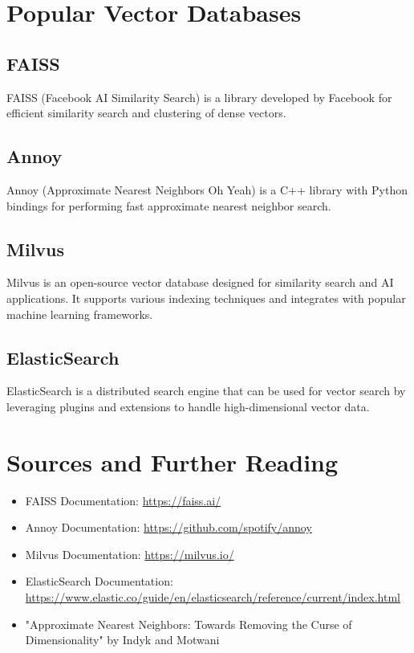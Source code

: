 \section{Popular Vector Databases}

\subsection{FAISS}
FAISS (Facebook AI Similarity Search) is a library developed by Facebook for efficient similarity search and clustering of dense vectors.

\subsection{Annoy}
Annoy (Approximate Nearest Neighbors Oh Yeah) is a C++ library with Python bindings for performing fast approximate nearest neighbor search.

\subsection{Milvus}
Milvus is an open-source vector database designed for similarity search and AI applications. It supports various indexing techniques and integrates with popular machine learning frameworks.

\subsection{ElasticSearch}
ElasticSearch is a distributed search engine that can be used for vector search by leveraging plugins and extensions to handle high-dimensional vector data.

\section{Sources and Further Reading}
\begin{itemize}
    \item FAISS Documentation: \url{https://faiss.ai/}
    \item Annoy Documentation: \url{https://github.com/spotify/annoy}
    \item Milvus Documentation: \url{https://milvus.io/}
    \item ElasticSearch Documentation: \url{https://www.elastic.co/guide/en/elasticsearch/reference/current/index.html}
    \item "Approximate Nearest Neighbors: Towards Removing the Curse of Dimensionality" by Indyk and Motwani
\end{itemize}

